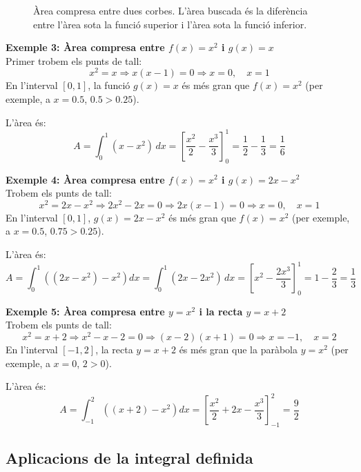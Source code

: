 \documentclass[12pt]{article}
\begin{document}
\begin{figure}[h]
    \centering
    \caption{Àrea compresa entre dues corbes. L'àrea buscada és la diferència entre l'àrea sota la funció superior i l'àrea sota la funció inferior.}
    \label{fig:area_entre_corbes}
\end{figure}

\begin{exemple}
\textbf{Exemple 3: Àrea compresa entre $f(x)=x^2$ i $g(x)=x$}\\
Primer trobem els punts de tall:
\[
x^2 = x \Rightarrow x(x-1)=0 \Rightarrow x=0, \quad x=1
\]
En l'interval $[0,1]$, la funció $g(x)=x$ és més gran que $f(x)=x^2$ (per exemple, a $x=0.5$, $0.5 > 0.25$).

L'àrea és:
\[
A = \int_0^1 (x - x^2)\,dx = \left[\frac{x^2}{2} - \frac{x^3}{3}\right]_0^1 = \frac{1}{2} - \frac{1}{3} = \frac{1}{6}
\]
\end{exemple}

\begin{exemple}
\textbf{Exemple 4: Àrea compresa entre $f(x)=x^2$ i $g(x)=2x-x^2$}\\
Trobem els punts de tall:
\[
x^2 = 2x - x^2 \Rightarrow 2x^2 - 2x = 0 \Rightarrow 2x(x-1)=0 \Rightarrow x=0, \quad x=1
\]
En l'interval $[0,1]$, $g(x)=2x-x^2$ és més gran que $f(x)=x^2$ (per exemple, a $x=0.5$, $0.75 > 0.25$).

L'àrea és:
\[
A = \int_0^1 \left( (2x-x^2) - x^2 \right) dx = \int_0^1 (2x - 2x^2)\,dx = \left[x^2 - \frac{2x^3}{3}\right]_0^1 = 1 - \frac{2}{3} = \frac{1}{3}
\]
\end{exemple}

\begin{exemple}
\textbf{Exemple 5: Àrea compresa entre $y=x^2$ i la recta $y=x+2$}\\
Trobem els punts de tall:
\[
x^2 = x+2 \Rightarrow x^2 - x - 2 = 0 \Rightarrow (x-2)(x+1)=0 \Rightarrow x=-1, \quad x=2
\]
En l'interval $[-1,2]$, la recta $y=x+2$ és més gran que la paràbola $y=x^2$ (per exemple, a $x=0$, $2>0$).

L'àrea és:
\[
A = \int_{-1}^2 \left( (x+2) - x^2 \right) dx = \left[\frac{x^2}{2} + 2x - \frac{x^3}{3}\right]_{-1}^2 = \frac{9}{2}
\]
\end{exemple}

\subsection{Aplicacions de la integral definida}
\end{document}

